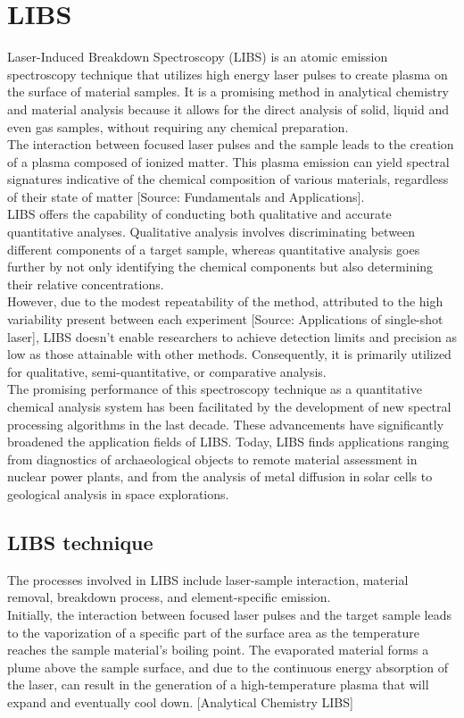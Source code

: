 \label{ch:experimental_techniques}

\section{LIBS}
\label{sec:LIBS}
Laser-Induced Breakdown Spectroscopy (LIBS) is an atomic emission spectroscopy technique that utilizes high energy laser pulses to create plasma on the surface of material samples. It is a promising method in analytical chemistry and material analysis because it allows for the direct analysis of solid, liquid and even gas samples, without requiring any chemical preparation.
\\
The interaction between focused laser pulses and the sample leads to the creation of a plasma composed of ionized matter. This plasma emission can yield spectral signatures indicative of the chemical composition of various materials, regardless of their state of matter [Source: Fundamentals and Applications].
\\
LIBS offers the capability of conducting both qualitative and accurate quantitative analyses. Qualitative analysis involves discriminating between different components of a target sample, whereas quantitative analysis goes further by not only identifying the chemical components but also determining their relative concentrations.
\\
However, due to the modest repeatability of the method, attributed to the high variability present between each experiment [Source: Applications of single-shot laser], LIBS doesn’t enable researchers to achieve detection limits and precision as low as those attainable with other methods. Consequently, it is primarily utilized for qualitative, semi-quantitative, or comparative analysis.
\\
The promising performance of this spectroscopy technique as a quantitative chemical analysis system has been facilitated by the development of new spectral processing algorithms in the last decade. These advancements have significantly broadened the application fields of LIBS. Today, LIBS finds applications ranging from diagnostics of archaeological objects to remote material assessment in nuclear power plants, and from the analysis of metal diffusion in solar cells to geological analysis in space explorations.

\subsection{LIBS technique}
\label{subsec:LIBS_technique}
The processes involved in LIBS include laser-sample interaction, material removal, breakdown process, and element-specific emission.
\\
Initially, the interaction between focused laser pulses and the target sample leads to the vaporization of a specific part of the surface area as the temperature reaches the sample material’s boiling point. The evaporated material forms a plume above the sample surface, and due to the continuous energy absorption of the laser, can result in the generation of a high-temperature plasma that will expand and eventually cool down.
[Analytical Chemistry LIBS]

